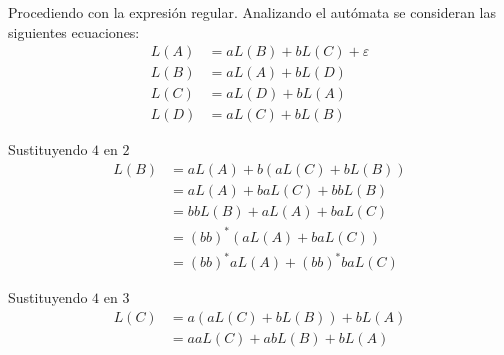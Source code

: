 \documentclass{article}
\begin{document}
\begin{enumerate}
        Procediendo con la expresión regular. Analizando el autómata se consideran las siguientes ecuaciones:
        \begin{align}
          L(A) &= aL(B) + bL(C) + \varepsilon \\
          L(B) &= aL(A) + bL(D)\\
          L(C) &= aL(D) + bL(A)\\
          L(D) &= aL(C) + bL(B)
        \end{align}

        Sustituyendo $4$ en $2$
        \begin{equation}
        \begin{aligned}
          L(B) &= aL(A) + b(aL(C) + bL(B)) \\
               &= aL(A) + baL(C) + bbL(B) \\
               &= bbL(B) + aL(A) + baL(C) \\
               &= (bb)^* (aL(A) + baL(C)) \\
               &= (bb)^*aL(A) + (bb)^*baL(C)
        \end{aligned}
        \end{equation}

        Sustituyendo $4$ en $3$
        \begin{equation}
        \begin{aligned}
          L(C) &= a(aL(C) + bL(B)) + bL(A)\\
               &= aaL(C) + abL(B) + bL(A) 
        \end{aligned}
        \end{equation}


\end{enumerate}
\end{document}
